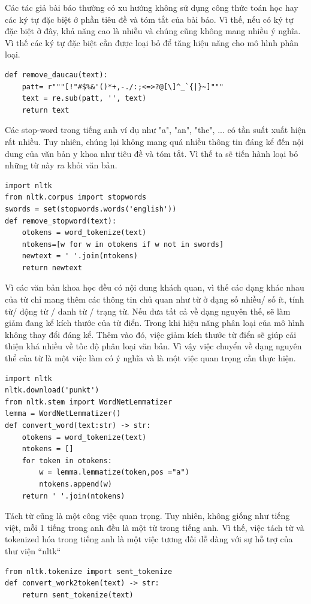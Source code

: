 \documentclass[../DoAn.tex]{subfiles}
\begin{document}
Các tác giả bài báo thường có xu hướng không sử dụng công thức toán học hay các ký tự đặc biệt ở phần tiêu đề và tóm tắt của bài báo. Vì thế, nếu có ký tự đặc biệt ở đây, khả năng cao là nhiễu và chúng cũng không mang nhiều ý nghĩa. Vì thế các ký tự đặc biệt cần được loại bỏ để tăng hiệu năng cho mô hình phân loại. 
\begin{lstlisting}
def remove_daucau(text):
    patt= r"""[!"#$%&'()*+,-./:;<=>?@[\]^_`{|}~]"""
    text = re.sub(patt, '', text)
    return text
\end{lstlisting}

Các stop-word trong tiếng anh ví dụ như "a", "an", "the", ... có tần suất xuất hiện rất nhiều. Tuy nhiên, chúng lại không mang quá nhiều thông tin đáng kể đến nội dung của văn bản y khoa như tiêu đề và tóm tắt. Vì thế ta sẽ tiến hành loại bỏ những từ này ra khỏi văn bản.
\begin{lstlisting}
import nltk
from nltk.corpus import stopwords
swords = set(stopwords.words('english'))
def remove_stopword(text):
    otokens = word_tokenize(text)
    ntokens=[w for w in otokens if w not in swords]
    newtext = ' '.join(ntokens)
    return newtext

\end{lstlisting}
Vì các văn bản khoa học đều có nội dung khách quan, vì thế các dạng khác nhau của từ chỉ mang thêm các thông tin chủ quan như từ ở dạng số nhiều/ số ít, tính từ/ động từ / danh từ / trạng từ. Nếu đưa tất cả về dạng nguyên thế, sẽ làm giảm đang kể kích thước của từ điển. Trong khi hiệu năng phân loại của mô hình không thay đổi đáng kể. Thêm vào đó, việc giảm kích thước từ điển sẽ giúp cải thiện khá nhiều về tốc độ phân loại văn bản. Vì vậy việc chuyển về dạng nguyên thể của từ là một việc làm có ý nghĩa và là một việc quan trọng cần thực hiện.
\begin{lstlisting}
import nltk
nltk.download('punkt')
from nltk.stem import WordNetLemmatizer
lemma = WordNetLemmatizer()
def convert_word(text:str) -> str:
    otokens = word_tokenize(text)
    ntokens = []
    for token in otokens:
        w = lemma.lemmatize(token,pos ="a")
        ntokens.append(w)
    return ' '.join(ntokens)
\end{lstlisting}

Tách từ cũng là một công việc quan trọng. Tuy nhiên, không giống như tiếng việt, mỗi 1 tiếng trong anh đều là một từ trong tiếng anh. Vì thế, việc tách từ và tokenized hóa trong tiếng anh là một việc tương đối dễ dàng với sự hỗ trợ của thư viện ``nltk``
\begin{lstlisting}
from nltk.tokenize import sent_tokenize
def convert_work2token(text) -> str:
    return sent_tokenize(text)
\end{lstlisting}
\end{document}
